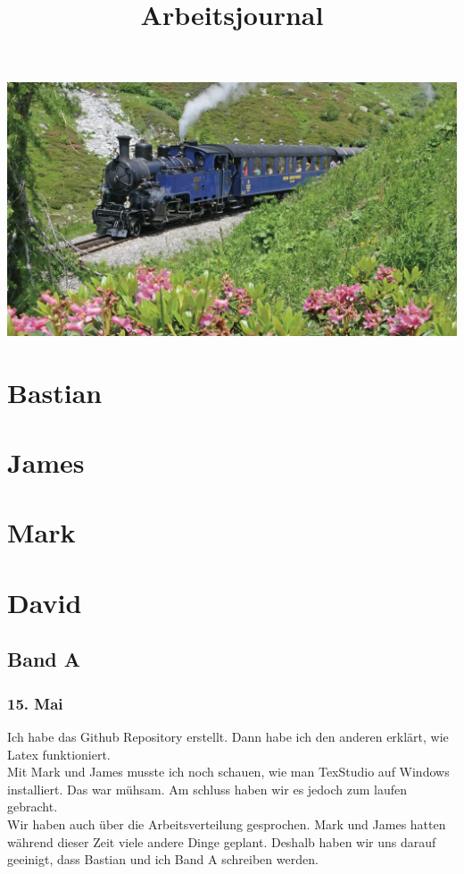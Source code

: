 \documentclass[10pt]{article}
\title{Arbeitsjournal}
\begin{document}
	\maketitle
	\includegraphics[width=17.5cm]{title}
	\pagebreak
	\tableofcontents
	\pagebreak
	\section{Bastian}
	\section{James}
	\section{Mark}
	\section{David}
	\subsection{Band A}
	\subsubsection{15. Mai}
	Ich habe das Github Repository erstellt. Dann habe ich den anderen erklärt, wie Latex funktioniert.\\
	Mit Mark und James musste ich noch schauen, wie man TexStudio auf Windows installiert. Das war mühsam. Am schluss haben wir es jedoch zum laufen gebracht.\\
	Wir haben auch über die Arbeitsverteilung gesprochen. Mark und James hatten während dieser Zeit viele andere Dinge geplant. Deshalb haben wir uns darauf geeinigt, dass Bastian und ich Band A schreiben werden.\\
\end{document}
